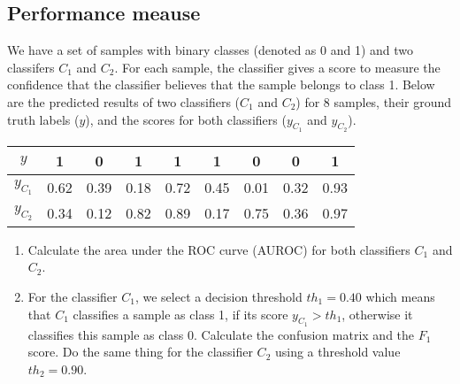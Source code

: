 \documentclass{article}
\begin{document}
    \subsection{Performance meause}
    We have a set of samples with binary classes (denoted as 0 and 1) and two classifers $C_1$ and $C_2$.
    For each sample, the classifier gives a score to measure the confidence that the classifier believes that the sample belongs to class 1.
    Below are the predicted results of two classifiers ($C_1$ and $C_2$) for 8 samples, their ground truth labels ($y$), and the scores  for both classifiers ($y_{C_1}$ and $y_{C_2}$).
	\begin{table}[htbp]
		\centering
		\begin{tabular}{c|cccccccc}
			\hline
			$y$ & 1 & 0 & 1 & 1 & 1 & 0 & 0 & 1\\
			\hline
			$y_{C_1}$ & 0.62 & 0.39 & 0.18 & 0.72 & 0.45 & 0.01 & 0.32 & 0.93\\
			\hline
			$y_{C_2}$ & 0.34 & 0.12 & 0.82 & 0.89 & 0.17 & 0.75 & 0.36 & 0.97\\
			\hline
		\end{tabular}
	\end{table}
	\begin{enumerate}[(1)]
        \item Calculate the area under the ROC curve (AUROC) for both classifiers $C_1$ and $C_2$. 
        \item For the classifier $C_1$, we select a decision threshold $th_1 = 0.40$ which means that $C_1$ classifies a sample as class 1, if its score $y_{C_1} > th_1$, otherwise it classifies this sample as class 0. 
        Calculate the confusion matrix and the $F_1$ score. 
        Do the same thing for the classifier $C_2$ using a threshold value $th_2 = 0.90$.
    \end{enumerate}

    \newpage
\end{document}
